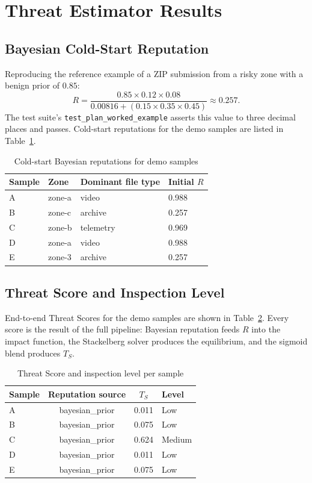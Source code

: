 \documentclass[12pt, a4paper]{report}
\begin{document}
\section{Threat Estimator Results}

\subsection{Bayesian Cold-Start Reputation}

Reproducing the reference example of a ZIP submission from a risky
zone with a benign prior of $0.85$:
\[
R = \frac{0.85 \times 0.12 \times 0.08}{0.00816 + (0.15 \times 0.35 \times 0.45)}
  \approx 0.257.
\]
The test suite's \texttt{test\_plan\_worked\_example} asserts this
value to three decimal places and passes. Cold-start reputations for
the demo samples are listed in Table~\ref{tab:gte_bayes}.

\begin{table}[H]
\centering
\caption{Cold-start Bayesian reputations for demo samples}
\label{tab:gte_bayes}
\begin{tabular}{@{}llll@{}}
\toprule
\textbf{Sample} & \textbf{Zone} & \textbf{Dominant file type} & \textbf{Initial $R$} \\
\midrule
A & zone-a & video & 0.988 \\
B & zone-c & archive & 0.257 \\
C & zone-b & telemetry & 0.969 \\
D & zone-a & video & 0.988 \\
E & zone-3 & archive & 0.257 \\
\bottomrule
\end{tabular}
\end{table}

\subsection{Threat Score and Inspection Level}

End-to-end Threat Scores for the demo samples are shown in
Table~\ref{tab:gte_results}. Every score is the result of the full
pipeline: Bayesian reputation feeds $R$ into the impact function, the
Stackelberg solver produces the equilibrium, and the sigmoid blend
produces $T_S$.

\begin{table}[H]
\centering
\caption{Threat Score and inspection level per sample}
\label{tab:gte_results}
\begin{tabular}{@{}lccl@{}}
\toprule
\textbf{Sample} & \textbf{Reputation source} & \textbf{$T_S$} & \textbf{Level} \\
\midrule
A & bayesian\_prior & 0.011 & Low \\
B & bayesian\_prior & 0.075 & Low \\
C & bayesian\_prior & 0.624 & Medium \\
D & bayesian\_prior & 0.011 & Low \\
E & bayesian\_prior & 0.075 & Low \\
\bottomrule
\end{tabular}
\end{table}
\end{document}
